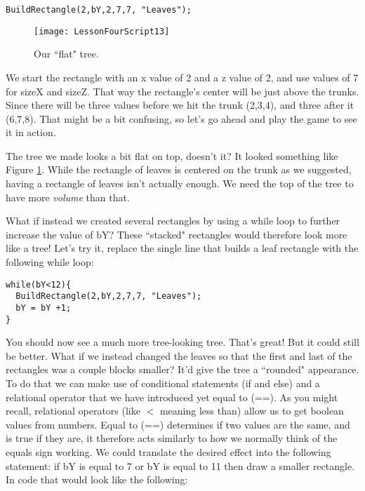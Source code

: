 \documentclass{article}
\begin{document}
\lstset{style=sharpc}
\begin{lstlisting}
BuildRectangle(2,bY,2,7,7, "Leaves");
\end{lstlisting} 
\begin{figure}
  \texttt{[image: LessonFourScript13]}
  \caption{Our ``flat" tree.}
  \label{fig:LessonFourScript13}
\end{figure}

We start the rectangle with an x value of 2 and a z value of 2, and use values of 7 for sizeX and sizeZ. That way the rectangle's center will be just above the trunks. Since there will be three values before we hit the trunk (2,3,4), and three after it (6,7,8). That might be a bit confusing, so let's go ahead and play the game to see it in action. 

\noindent{}

The tree we made looks a bit flat on top, doesn't it? It looked something like Figure \ref{fig:LessonFourScript13}. While the rectangle of leaves is centered on the trunk as we suggested, having a rectangle of leaves isn't actually enough. We need the top of the tree to have more \textit{volume} than that.

What if instead we created several rectangles by using a while loop to further increase the value of bY? These ``stacked" rectangles would therefore look more like a tree! Let's try it, replace the single line that builds a leaf rectangle with the following while loop:

\lstset{style=sharpc}
\begin{lstlisting}
while(bY<12){
  BuildRectangle(2,bY,2,7,7, "Leaves");
  bY = bY +1;
}
\end{lstlisting} 

\noindent{}

You should now see a much more tree-looking tree. That's great! But it could still be better. What if we instead changed the leaves so that the first and last of the rectangles was a couple blocks smaller? It'd give the tree a ``rounded" appearance. To do that we can make use of conditional statements (if and else) and a relational operator that we have introduced yet equal to (==). As you might recall, relational operators (like $<$ meaning less than) allow us to get boolean values from numbers. Equal to (==) determines if two values are the same, and is true if they are, it therefore acts similarly to how we normally think of the equals sign working. We could translate the desired effect into the following statement: if bY is equal to 7 or bY is equal to 11 then draw a smaller rectangle. In code that would look like the following: 
\end{document}
